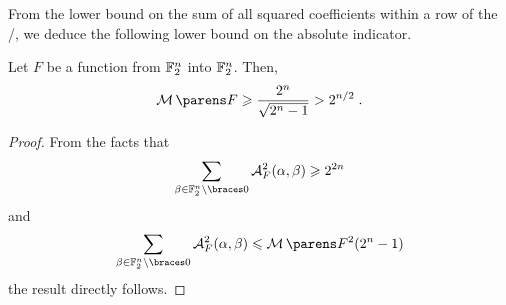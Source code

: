 From the lower bound on the sum of all squared coefficients within a row of the \ACT/, we deduce the following lower bound on the absolute indicator.
\begin{proposition} \label{prop:lowerbound}
    Let $F$ be a function from $\mathbb{F}_2^n$ into $\mathbb{F}_2^n$.
    Then,
    \begin{equation*}
        \absoluteindicator{F} \geqslant \frac{2^n}{\sqrt{2^n-1}} > 2^{n/2}\;.
    \end{equation*}
\end{proposition}
\begin{proof}
    From the facts that
    \begin{equation*}
        \sum_{\beta \in \F_2^n \setminus \set{0}} \AC{F}^2(\alpha, \beta) \geqslant 2^{2n}
    \end{equation*}
    and
    \begin{equation*}
        \sum_{\beta \in \F_2^n \setminus \set{0}} \AC{F}^2(\alpha, \beta) \leqslant \absoluteindicator{F}^2 (2^n-1)
    \end{equation*}
    the result directly follows.
\end{proof}

